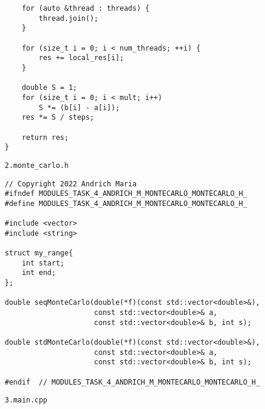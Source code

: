 \documentclass{report}
\begin{document}
\begin{lstlisting}
    for (auto &thread : threads) {
        thread.join();
    }

    for (size_t i = 0; i < num_threads; ++i) {
        res += local_res[i];
    }

    double S = 1;
    for (size_t i = 0; i < mult; i++)
        S *= (b[i] - a[i]);
    res *= S / steps;

    return res;
}
\end{lstlisting}
\par \verb|2.monte_carlo.h|
\begin{lstlisting}
// Copyright 2022 Andrich Maria
#ifndef MODULES_TASK_4_ANDRICH_M_MONTECARLO_MONTECARLO_H_
#define MODULES_TASK_4_ANDRICH_M_MONTECARLO_MONTECARLO_H_

#include <vector>
#include <string>

struct my_range{
    int start;
    int end;
};

double seqMonteCarlo(double(*f)(const std::vector<double>&),
                     const std::vector<double>& a,
                     const std::vector<double>& b, int s);

double stdMonteCarlo(double(*f)(const std::vector<double>&),
                     const std::vector<double>& a,
                     const std::vector<double>& b, int s);

#endif  // MODULES_TASK_4_ANDRICH_M_MONTECARLO_MONTECARLO_H_
\end{lstlisting}
\par \verb|3.main.cpp|
\end{document}
